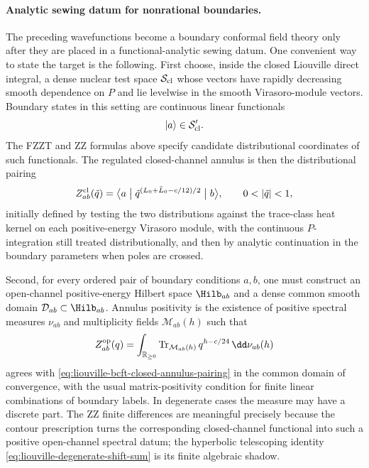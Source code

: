 \paragraph{Analytic sewing datum for nonrational boundaries.}
The preceding wavefunctions become a boundary conformal field theory only
after they are placed in a functional-analytic sewing datum.  One convenient
way to state the target is the following.  First choose, inside the closed
Liouville direct integral, a dense nuclear test space
\(\mathcal S_{\rm cl}\) whose vectors have rapidly decreasing smooth
dependence on \(P\) and lie levelwise in the smooth Virasoro-module
vectors.  Boundary states in this setting are continuous linear functionals
\[
  |a\rangle\in\mathcal S_{\rm cl}' .
\]
The FZZT and ZZ formulas above specify candidate distributional coordinates
of such functionals.  The regulated closed-channel annulus is then the
distributional pairing
\begin{equation}
  Z_{ab}^{\rm cl}(\tilde q)
  =
  \bigl\langle a\bigm|
  \tilde q^{(L_0+\bar L_0-c/12)/2}
  \bigm|b\bigr\rangle ,
  \qquad 0<|\tilde q|<1,
  \label{eq:liouville-bcft-closed-annulus-pairing}
\end{equation}
initially defined by testing the two distributions against the trace-class
heat kernel on each positive-energy Virasoro module, with the continuous
\(P\)-integration still treated distributionally, and then by analytic
continuation in the boundary parameters when poles are crossed.

Second, for every ordered pair of boundary conditions \(a,b\), one must
construct an open-channel positive-energy Hilbert space \(\Hilb_{ab}\) and a
dense common smooth domain \(\mathcal D_{ab}\subset\Hilb_{ab}\).  Annulus
positivity is the existence of positive spectral measures \(\nu_{ab}\) and
multiplicity fields \(\mathcal M_{ab}(h)\) such that
\begin{equation}
  Z_{ab}^{\rm op}(q)
  =
  \int_{\mathbb R_{\ge0}}
  \operatorname{Tr}_{\mathcal M_{ab}(h)}
  q^{h-c/24}\,\dd\nu_{ab}(h)
  \label{eq:liouville-bcft-open-annulus-measure}
\end{equation}
agrees with \eqref{eq:liouville-bcft-closed-annulus-pairing} in the common
domain of convergence, with the usual matrix-positivity condition for finite
linear combinations of boundary labels.  In degenerate cases the measure may
have a discrete part.  The ZZ finite differences are meaningful precisely
because the contour prescription turns the corresponding closed-channel
functional into such a positive open-channel spectral datum; the hyperbolic
telescoping identity \eqref{eq:liouville-degenerate-shift-sum} is its finite
algebraic shadow.

